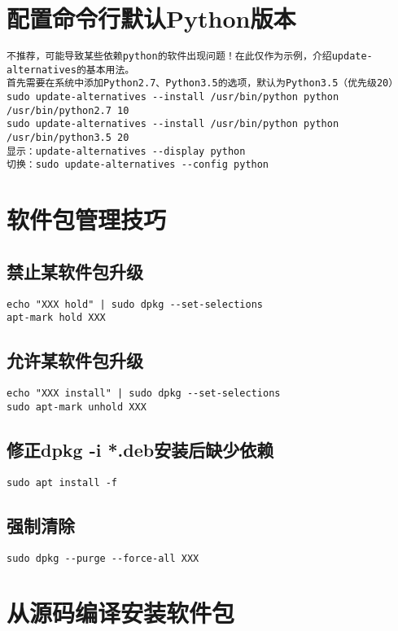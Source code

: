 \documentclass[a4paper,fontset=fandol,zihao=-4,linespread=1.2,oneside]{ctexbook}
\begin{document}
\section{配置命令行默认Python版本}
\begin{lstlisting}
不推荐，可能导致某些依赖python的软件出现问题！在此仅作为示例，介绍update-alternatives的基本用法。
首先需要在系统中添加Python2.7、Python3.5的选项，默认为Python3.5（优先级20）
sudo update-alternatives --install /usr/bin/python python /usr/bin/python2.7 10
sudo update-alternatives --install /usr/bin/python python /usr/bin/python3.5 20
显示：update-alternatives --display python
切换：sudo update-alternatives --config python
\end{lstlisting}

\section{软件包管理技巧}

\subsection{禁止某软件包升级}
\begin{lstlisting}
echo "XXX hold" | sudo dpkg --set-selections
apt-mark hold XXX
\end{lstlisting}

\subsection{允许某软件包升级}
\begin{lstlisting}
echo "XXX install" | sudo dpkg --set-selections
sudo apt-mark unhold XXX
\end{lstlisting}

\subsection{修正dpkg -i *.deb安装后缺少依赖}
\begin{lstlisting}
sudo apt install -f
\end{lstlisting}

\subsection{强制清除}
\begin{lstlisting}
sudo dpkg --purge --force-all XXX
\end{lstlisting}

\section{从源码编译安装软件包}
\end{document}
